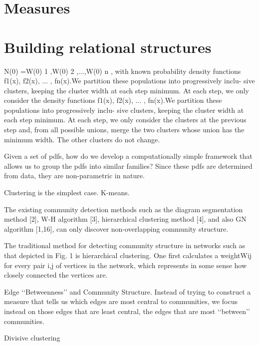 \documentclass[../main.tex]{subfiles}
\begin{document}
\section{Measures}\label{measures_review}
\section{Building relational structures}\label{algorithms_review}

\cite{VoVan2010}
N(0) ={W(0)
1 ,W(0) 2 ,...,W(0) n }, with known probability
density functions {f1(x), f2(x), ... , fn(x)}.We partition these populations into progressively inclu- sive clusters, keeping the cluster width at each step minimum. At each step, we only consider the
density functions {f1(x), f2(x), ... , fn(x)}.We partition these populations into progressively inclu- sive clusters, keeping the cluster width at each step minimum. At each step, we only consider the
clusters at the previous step and, from all possible unions, merge the two clusters whose union
has the minimum width. The other clusters do not change.

\cite{Goh2008}
Given a set of pdfs, how do
we develop a computationally simple framework that allows us to group the pdfs into
similar families? Since these pdfs are determined from data, they are non-parametric in
nature.

\cite{hastie2008}
Clustering is the simplest case. K-means. 

\cite{Lu2012}
    The existing community detection methods such as the
diagram segmentation method [2], W-H algorithm [3], hierarchical clustering method [4], and also GN algorithm [1,16], can
only discover non-overlapping community
structure.


\cite{Girvan2002}
The traditional method for detecting community structure in networks such as that depicted in Fig. 1 is
hierarchical clustering. One first calculates a weightWij for every
pair i,j of vertices in the network, which represents in some sense
how closely connected the vertices are.


Edge ‘‘Betweenness’’ and Community Structure.
Instead of trying to construct a measure that tells us which
edges are most central to communities, we focus instead on those
edges that are least central, the edges that are most ‘‘between’’
communities.

\cite{hastie2008}
Divisive clustering
\section{}
\end{document}
